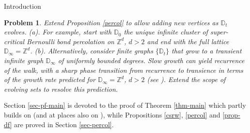 \documentclass[12pt,reqno]{amsart}
\numberwithin{equation}{section}
\newtheorem{pbm}[thm]{Problem}
\theoremstyle{definition}
\begin{document}
\begin{section}{Introduction}
\begin{pbm} Extend Proposition \ref{percol} to allow adding new vertices as ${\mathbb{D}}_t$ evolves. 
\newline
(a). For example, start with ${\mathbb{D}}_0$ the 
unique infinite cluster of super-critical Bernoulli bond percolation on ${\mathbb{Z}}^d$, $d>2$
and end with the full lattice ${\mathbb{D}}_\infty={\mathbb{Z}}^d$.
\newline
(b). Alternatively, consider finite graphs $\{{\mathbb{D}}_t\}$ that grow to a 
transient infinite graph ${\mathbb{D}}_\infty$ of uniformly bounded degrees. 
Slow growth can yield recurrence of the walk, with a sharp phase transition 
from recurrence to transience 
in terms of the growth rate 
predicted for ${\mathbb{D}}_\infty={\mathbb{Z}}^d$, $d>2$ (see \cite[Theorem 1.4, Conjecture 1.2]{DHS}). 
Extend the scope of evolving sets to resolve this prediction.
\end{pbm}

Section \ref{sec-pf-main} is devoted to 
the proof of Theorem \ref{thm-main} 
which partly builds on \cite{MP2} 
(and at places also on \cite[Ch. 3]{Ku}), while Propositions 
\ref{csrw}, \ref{percol} and \ref{prop-df} 
are proved in Section \ref{sec-percol}. 
\end{section}
\end{document}
